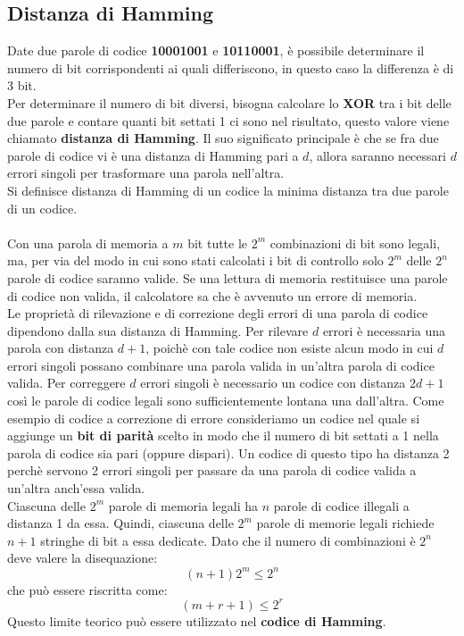 \documentclass[12pt]{report}
\begin{document}
\subsection{Distanza di Hamming}
Date due parole di codice \textbf{10001001} e \textbf{10110001}, è possibile determinare il numero di bit corrispondenti ai quali differiscono, in questo caso la differenza è di 3 bit.\\
Per determinare il numero di bit diversi, bisogna calcolare lo \textbf{XOR} tra i bit delle due parole e contare quanti bit settati 1 ci sono nel risultato, questo valore viene chiamato \textbf{distanza di Hamming}. Il suo significato principale è che se fra due parole di codice vi è una distanza di Hamming pari a $d$, allora saranno necessari $d$ errori singoli per trasformare una parola nell'altra. \\
Si definisce distanza di Hamming di un codice la minima distanza tra due parole di un codice. \\
\\
Con una parola di memoria a $m$ bit tutte le $2^m$ combinazioni di bit sono legali, ma, per via del modo in cui sono stati calcolati i bit di controllo solo $2^m$ delle $2^n$ parole di codice saranno valide. Se una lettura di memoria restituisce una parole di codice non valida, il calcolatore sa che è avvenuto un errore di memoria.
\\
Le proprietà di rilevazione e di correzione degli errori di una parola di codice dipendono dalla sua distanza di Hamming. Per rilevare $d$ errori è necessaria una parola con distanza $d + 1$, poichè con tale codice non esiste alcun modo in cui $d$ errori singoli possano combinare una parola valida in un'altra parola di codice valida. Per correggere $d$ errori singoli è necessario un codice con distanza $2d + 1$ così le parole di codice legali sono sufficientemente lontana una dall'altra.
Come esempio di codice a correzione di errore consideriamo un codice nel quale si aggiunge un \textbf{bit di parità} scelto in modo che il numero di bit settati a 1 nella parola di codice sia pari (oppure dispari). Un codice di questo tipo ha distanza 2 perchè servono 2 errori singoli per passare da una parola di codice valida a un'altra anch'essa valida. \\
Ciascuna delle $2^m$ parole di memoria legali ha $n$ parole di codice illegali a distanza 1 da essa. Quindi, ciascuna delle $2^m$ parole di memorie legali richiede $n + 1$ stringhe di bit a essa dedicate. Dato che il numero di combinazioni è $2^n$ deve valere la disequazione:
\[
(n + 1)2^m \leq 2^n
\]
che può essere riscritta come:
\[
(m + r + 1) \leq 2^r
\]
Questo limite teorico può essere utilizzato nel \textbf{codice di Hamming}.
\end{document}
